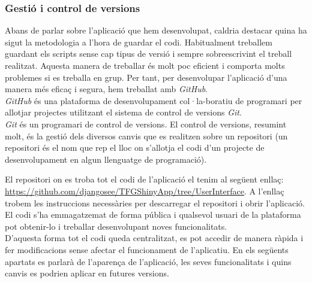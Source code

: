 \documentclass[english]{article}
\begin{document}
\subsubsection{Gestió i control de versions}
Abans de parlar sobre l'aplicació que hem desenvolupat, caldria destacar quina ha sigut la metodologia a l'hora de guardar el codi. Habitualment treballem guardant els scripts sense cap tipus de versió i sempre sobreescrivint el treball realitzat. Aquesta manera de treballar és molt poc eficient i comporta molts problemes si es treballa en grup. Per tant, per desenvolupar l'aplicació d'una manera més efica\c{c} i segura, hem treballat amb \textit{GitHub}.
\\

\textit{GitHub} és una plataforma de desenvolupament col·la-boratiu de programari per allotjar projectes utilitzant el sistema de control de versions \textit{Git}.
\\

\textit{Git} és un programari de control de versions. El control de versions, resumint molt, és la gestió dels diversos canvis que es realitzen sobre un repositori (un repositori és el nom que rep el lloc on s'allotja el codi d'un projecte de desenvolupament en algun llenguatge de programació).

\newpage
El repositori on es troba tot el codi de l'aplicació el tenim al següent enlla\c{c}: \url{https://github.com/djangosee/TFGShinyApp/tree/UserInterface}.
A l'enlla\c{c} trobem les instruccions necessàries per descarregar el repositori i obrir l'aplicació. El codi s'ha emmagatzemat de forma pública i qualsevol usuari de la plataforma pot obtenir-lo i treballar desenvolupant noves funcionalitats.
\\

D'aquesta forma tot el codi queda centralitzat, es pot accedir de manera ràpida i fer modificacions sense afectar el funcionament de l'aplicatiu. En els següents apartats es parlarà de l'aparen\c{c}a de l'aplicació, les seves funcionalitats i quins canvis es podrien aplicar en futures versions.
\end{document}

